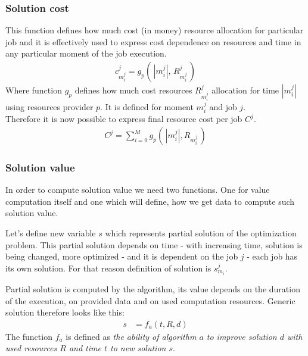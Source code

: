 \subsubsection{Solution cost}
This function defines how much cost (in money) resource allocation for particular job
and it is effectively used to express cost dependence on resources and time in any particular moment of the job execution.
\begin{align*}
	c_{m_{i}^{j}}^{j} = g_{p} (\, |m_{i}^{j}|,\, R_{m_{i}^{j}}^{j} \,) 
\end{align*}
Where function $g_{p}$ defines how much cost resources $R_{m_{i}^{j}}^{j}$ allocation for time $|m_{i}^{j}|$ using resources provider $p$.
It is defined for moment $m_{i}^{j}$ and job $j$.\\
Therefore it is now possible to express final resource cost per job $C^{j}$.
\begin{align*}
	C^{j} = \sum_{i = 0}^{M} g_{p} (\, |m_{i}^{j}|, R_{m_{i}^{j}} \,) 
\end{align*}

\subsubsection{Solution value}
In order to compute solution value we need two functions.
One for value computation itself and one which will define,
how we get data to compute such solution value.

Let's define new variable $s$ which represents partial solution of the optimization problem.
This partial solution depends on time - with increasing time, solution is being changed, more optimized -
and it is dependent on the job $j$ - each job has its own solution.
For that reason definition of solution is $s_{m_{i}}^{j}$.

Partial solution is computed by the algorithm,
its value depends on the duration of the execution,
on provided data and on used computation resources.
Generic solution therefore looks like this:
\begin{align*}
	s & = f_a(t, R, d) 
\end{align*}
The function $f_{a}$ is defined as \textit{the ability of algorithm $a$ to improve solution $d$ with used resources $R$ and time $t$ to new solution $s$}.

